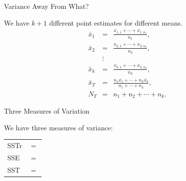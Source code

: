 \begin{frame}{Variance Away From What?}

  We have $k+1$ different point estimates for different means.
  \begin{eqnarray*}
    \bar{x}_1 & = & \frac{x_{1,1} + \cdots + x_{1,n_1}}{n_1}, \\
    \bar{x}_2 & = & \frac{x_{2,1} + \cdots + x_{2,n_2}}{n_2}, \\
              & \vdots & \\
    \bar{x}_k & = & \frac{x_{k,1} + \cdots + x_{k,n_k}}{n_k}, \\
    \bar{x}_T & = & \frac{n_1 \bar{x_1} + \cdots + n_k \bar{x_k}}{n_1+\cdots+n_k}, \\
    N_T       & = & n_1+n_2+\cdots+n_k.
  \end{eqnarray*}
  
\end{frame}

\begin{frame}{Three Measures of Variation}


  We have three measures of variance: \\
  \begin{tabular}{ll}
    SSTr & $=$ \\ %
    SSE  & $=$ \\ %
    SST  & $=$ \\ %
  \end{tabular}
  
\end{frame}


